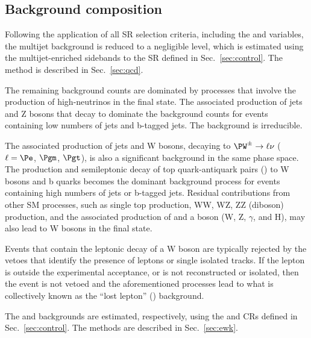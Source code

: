 
\subsection{Background composition}
\label{sec:bkgd}

Following the application of all SR selection criteria, including the
\alphat and \bdphi variables, the multijet background is reduced to a
negligible level, which is estimated using the multijet-enriched
sidebands to the SR defined in Sec.~\ref{sec:control}. The method is
described in Sec.~\ref{sec:qcd}.

The remaining background counts are dominated by processes that
involve the production of high-\pt neutrinos in the final state. The
associated production of jets and Z bosons that decay to \znunu
dominate the background counts for events containing low numbers of
jets and b-tagged jets. The \znunuj background is irreducible.

The associated production of jets and W bosons, decaying to $\PW^\pm
\to \ell\nu$ ($\ell=\Pe$, $\Pgm$, $\Pgt$), is also a significant
background in the same phase space. The production and semileptonic
decay of top quark-antiquark pairs (\ttbar) to W bosons and b quarks
becomes the dominant background process for events containing high
numbers of jets or b-tagged jets. Residual contributions from other SM
processes, such as single top production, WW, WZ, ZZ (diboson)
production, and the associated production of \ttbar and a boson
({\ttbar}W, {\ttbar}Z, {\ttbar}$\gamma$, and {\ttbar}H), may also lead
to W bosons in the final state.

Events that contain the leptonic decay of a W boson are typically
rejected by the vetoes that identify the presence of leptons or single
isolated tracks. If the lepton is outside the experimental acceptance,
or is not reconstructed or isolated, then the event is not vetoed and
the aforementioned processes lead to what is collectively known as the
``lost lepton'' (\lost) background.

The \lost and \znunuj backgrounds are estimated, respectively, using
the \mj and \mmj CRs defined in Sec.~\ref{sec:control}. The methods
are described in Sec.~\ref{sec:ewk}.


